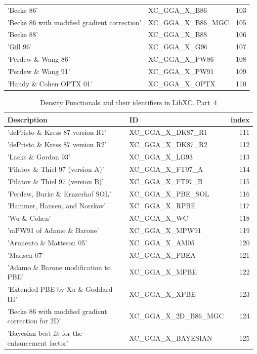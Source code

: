 \documentclass[final,12pt,makeidx,DIV=calc]{article}
\begin{document}
{{{{{{\begin{table}[!h]
\begin{center}
\begin{tabular}{llr}
  'Becke 86' & XC\_GGA\_X\_B86  &103\\
  'Becke 86 with modified gradient correction' & XC\_GGA\_X\_B86\_MGC  &105\\
  'Becke 88' & XC\_GGA\_X\_B88  &106\\
  'Gill 96' & XC\_GGA\_X\_G96  &107\\
  'Perdew \& Wang 86' & XC\_GGA\_X\_PW86  &108\\
  'Perdew \& Wang 91' & XC\_GGA\_X\_PW91  &109\\
  'Handy \& Cohen OPTX 01' & XC\_GGA\_X\_OPTX  &110\\
\hline
\hline
\end{tabular}
\end{center}
\end{table}

\begin{table}[!h]
\caption{Density Functionals and their identifiers in LibXC. Part~4}
\begin{center}
\begin{tabular}{llr}
\hline
\hline
Description & ID & index\\
\hline
  'dePristo \& Kress 87 version R1' & XC\_GGA\_X\_DK87\_R1  &111\\
  'dePristo \& Kress 87 version R2' & XC\_GGA\_X\_DK87\_R2  &112\\
  'Lacks \& Gordon 93' & XC\_GGA\_X\_LG93  &113\\
  'Filatov \& Thiel 97 (version A)' & XC\_GGA\_X\_FT97\_A  &114\\
  'Filatov \& Thiel 97 (version B)' & XC\_GGA\_X\_FT97\_B  &115\\
  'Perdew, Burke \& Ernzerhof SOL' & XC\_GGA\_X\_PBE\_SOL  &116\\
  'Hammer, Hansen, and Norskov' & XC\_GGA\_X\_RPBE  &117\\
  'Wu \& Cohen' & XC\_GGA\_X\_WC  &118\\
  'mPW91 of Adamo \& Barone' & XC\_GGA\_X\_MPW91  &119\\
  'Armiento \& Mattsson 05' & XC\_GGA\_X\_AM05  &120\\
  'Madsen 07' & XC\_GGA\_X\_PBEA  &121\\
  'Adamo \& Barone modification to PBE' & XC\_GGA\_X\_MPBE  &122\\
  'Extended PBE by Xu \& Goddard III' & XC\_GGA\_X\_XPBE  &123\\
  'Becke 86 with modified gradient correction for 2D' & XC\_GGA\_X\_2D\_B86\_MGC  &124\\
  'Bayesian best fit for the enhancement factor' & XC\_GGA\_X\_BAYESIAN  &125\\

\end{tabular}
\end{center}
\end{table}}}}}}}
\end{document}
